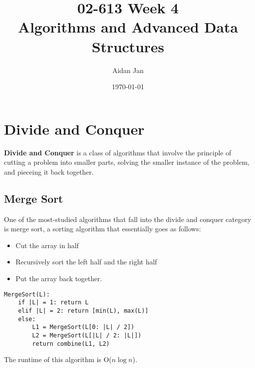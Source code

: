 \documentclass[10pt]{article}
\title{02-613 Week 4 \\ \large{Algorithms and Advanced Data Structures}}
\author{Aidan Jan}
\date{\today}
\begin{document}
\maketitle

\section*{Divide and Conquer}
\textbf{Divide and Conquer} is a class of algorithms that involve the principle of cutting a problem into smaller parts, solving the smaller instance of the problem, and pieceing it back together.

\subsection*{Merge Sort}
One of the most-studied algorithms that fall into the divide and conquer category is merge sort, a sorting algorithm that essentially goes as follows:
\begin{itemize}
    \item Cut the array in half
    \item Recursively sort the left half and the right half
    \item Put the array back together.
\end{itemize}
\begin{verbatim}
MergeSort(L):
    if |L| = 1: return L
    elif |L| = 2: return [min(L), max(L)]
    else:
        L1 = MergeSort(L[0: |L| / 2])
        L2 = MergeSort(L[|L| / 2: |L|])
        return combine(L1, L2)
\end{verbatim}
The runtime of this algorithm is O($n \log n$).
\end{document}
